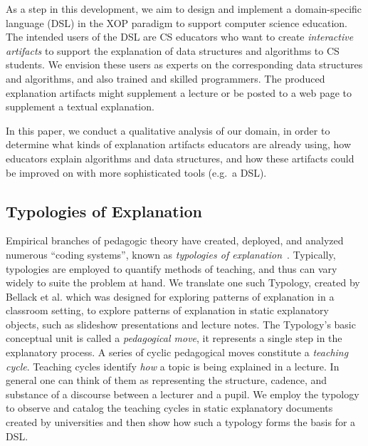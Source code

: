 \documentclass[conference]{IEEEtran}
\begin{document}
As a step in this development, we aim to design and implement a domain-specific
language (DSL) in the XOP paradigm to support computer science education. The
intended users of the DSL are CS educators who want to create \emph{interactive
artifacts} to support the explanation of data structures and algorithms to CS
students. We envision these users as experts on the corresponding data
structures and algorithms, and also trained and skilled programmers. The
produced explanation artifacts might supplement a lecture or be posted to a web
page to supplement a textual explanation.

In this paper, we conduct a qualitative analysis of our domain, in order to
determine what kinds of explanation artifacts educators are already using, how
educators explain algorithms and data structures, and how these artifacts could
be improved on with more sophisticated tools (e.g.\ a DSL).

\subsection{Typologies of Explanation}

Empirical branches of pedagogic theory have created, deployed, and analyzed
numerous ``coding systems'', known as \emph{typologies of
  explanation}~\cite{westbury1971research, nla.cat-vn407830,
  rosenshine1968objectively, hyman1968teaching, ennis1969logic,
  smith1967language, bellack1966language}. Typically, typologies are employed to
quantify methods of teaching, and thus can vary widely to suite the problem at
hand. We translate one such Typology, created by Bellack et
al.\cite{bellack1966language} which was designed for exploring patterns of
explanation in a classroom setting, to explore patterns of explanation in static
explanatory objects, such as slideshow presentations and lecture notes. The
Typology's basic conceptual unit is called a \emph{pedagogical move}, it
represents a single step in the explanatory process. A series of cyclic
pedagogical moves constitute a \emph{teaching cycle}. Teaching cycles identify
\emph{how} a topic is being explained in a lecture. In general one can think of
them as representing the structure, cadence, and substance of a discourse
between a lecturer and a pupil. We employ the typology to observe and catalog
the teaching cycles in static explanatory documents created by universities and
then show how such a typology forms the basis for a DSL.
\end{document}
